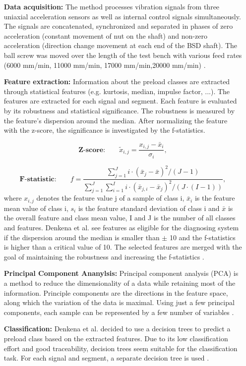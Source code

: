 \begin{itemize}
    \item [\textbf{Data acquisition:}] The method processes vibration signals from three uniaxial acceleration sensors as well as internal control signals simultaneously. The signals are concatenated, synchronized and separated in phases of zero acceleration (constant movement of nut on the shaft) and non-zero acceleration (direction change movement at each end of the BSD shaft). The ball screw was moved over the length of the test bench with various feed rates (6000 mm/min, 11000 mm/min, 17000 mm/min,20000 mm/min) \cite{Denkena2021}.
    \item [\textbf{Feature extraction:}] Information about the preload classes are extracted through statistical features (e.g. kurtosis, median, impulse factor, ...). The features are extracted for each signal and segment. Each feature is evaluated by its robustness and statistical significance. The robustness is measured by the feature's dispersion around the median. After normalizing the feature with the z-score, the significance is investigated by the f-statistics.
    
    \begin{equation}
        \textbf{Z-score:}\qquad \tilde{x}_{i,j} = \frac{x_{i,j} - \bar x_{i}}{\sigma_{i}},
    \end{equation}
    
    \begin{equation}
        \textbf{F-statistic:}\qquad f = \frac{\sum_{j=1}^{J} i \cdot (\bar x_{j} -\bar x)^{2}/(J-1)}{\sum_{j=1}^{J} \sum_{i=1}^{I} i \cdot (\bar x_{j,i} -\bar x_{j})^{2}/(J \cdot (I-1))},
    \end{equation}
    where ${x}_{i,j}$ denotes the feature value j of a sample of class i, $\bar{x}_{i}$ is the feature mean value of class i, ${s}_{i}$ is the feature standard deviation of class i and $\bar{x}$ is the overall feature and class mean value, I and J is the number of all classes and features. Denkena et al. see features as eligible for the diagnosing system if the dispersion around the median is smaller than $\pm$ 10 and the f-statistics is higher than a critical value of 10. The selected features are merged with the goal of maintaining the robustness and increasing the f-statistics  \cite{Denkena2021}. 
    
    \item [\textbf{Principal Component Ananylsis:}] 
    Principal component analysis (PCA) is a method to reduce the dimensionality of a data while retaining most of the information. Principle components are the directions in the feature space, along which the variation of the data is maximal. Using just a few principal components, each sample can be represented by a few number of variables \cite{Ringner2008}.
    
    \item [\textbf{Classification:}] Denkena et al. decided to use a decision trees to predict a preload class based on the extracted features. Due to its low classification effort and good traceability, decision trees seem suitable for the classification task. For each signal and segment, a separate decision tree is used  \cite{Denkena2021}. 
\end{itemize}

